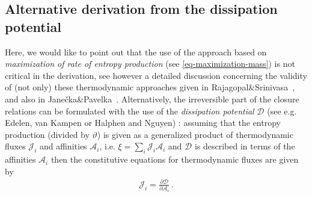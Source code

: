 \documentclass[a4paper]{article}
\begin{document}
\subsection{Alternative derivation from the dissipation potential}
\label{remark-dissipation-potential}
Here, we would like to point out that  the use of the approach based on \textit{maximization of rate of entropy production} (see \eqref{eq-maximization-mass}) is not critical in the derivation, see however a detailed discussion concerning the validity of (not only) these thermodynamic approaches given in Rajagopal\&Srinivasa~\cite{RajagopalSrinivasa2019}, and also in Jane\v{c}ka\&Pavelka~\cite{JaneckaPavelka2018}. Alternatively,  the irreversible part of the closure relations can be formulated with the use of the {\it dissipation potential} $\mathcal{D}$
(see e.g. Edelen\cite{Edelen1972}, van Kampen \cite{vanKampen1973} or Halphen and Nguyen\cite{halphen-nguyen-1975})
: assuming that the entropy production (divided by $\vartheta$) is given 
as a generalized product of thermodynamic fluxes $\mathcal{J}_i$ and affinities $\mathcal{A}_i$, i.e. $\xi = \sum_i \mathcal{J}_i\mathcal{A}_i$ and $\mathcal{D}$ is described in terms of the affinities $\mathcal{A}_i$ then the constitutive equations for thermodynamic fluxes are given by 
\begin{align}
\label{eq-dis-pot-Ji}
\mathcal{J}_i=\frac{\partial\mathcal D}{\partial\mathcal{A}_i}\,.
\end{align}
\end{document}
